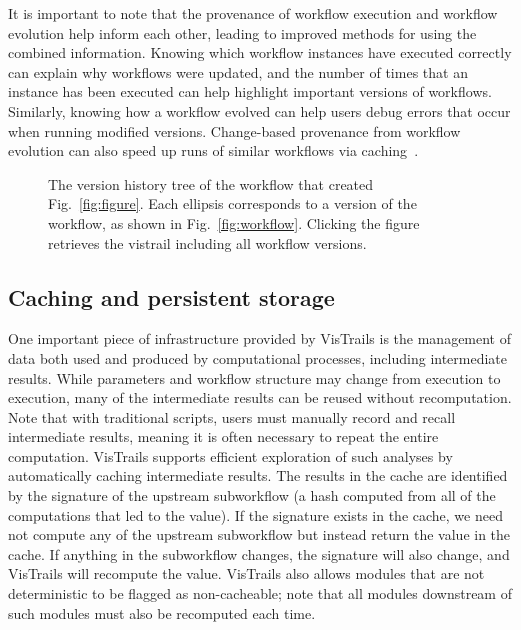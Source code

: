 \documentclass[12pt]{iopart}
\begin{document}
It is important to note that the provenance of workflow execution and
workflow evolution help inform each other, leading to improved methods
for using the combined information. Knowing which workflow instances
have executed correctly can explain why workflows were updated, and
the number of times that an instance has been executed can help
highlight important versions of workflows.  Similarly, knowing how a
workflow evolved can help users debug errors that occur when running
modified versions.  Change-based provenance from workflow evolution
can also speed up runs of similar workflows via
caching~\cite{bavoil@vis2005}.



\begin{figure}
\begin{center}
\caption{The version history tree of the workflow that created Fig.~\ref{fig:figure}. Each ellipsis corresponds to a version of the workflow, as shown in Fig.~\ref{fig:workflow}. Clicking the figure retrieves the vistrail including all workflow versions.}
\label{fig:history}
\end{center}
\end{figure}


\subsection{Caching and persistent storage}


One important piece of infrastructure provided by VisTrails is the
management of data both used and produced by computational processes,
including intermediate results.  While parameters and workflow
structure may change from execution to execution, many of the
intermediate results can be reused without recomputation.  Note that
with traditional scripts, users must manually record and recall
intermediate results, meaning it is often necessary to repeat the
entire computation.  VisTrails supports efficient exploration of such
analyses by automatically caching intermediate results.  The results
in the cache are identified by the signature of the upstream
subworkflow (a hash computed from all of the computations that led to
the value).  If the signature exists in the cache, we need not compute
any of the upstream subworkflow but instead return the value in the
cache.  If anything in the subworkflow changes, the signature will
also change, and VisTrails will recompute the value.  VisTrails also
allows modules that are not deterministic to be flagged as
non-cacheable; note that all modules downstream of such modules must
also be recomputed each time.
\end{document}
